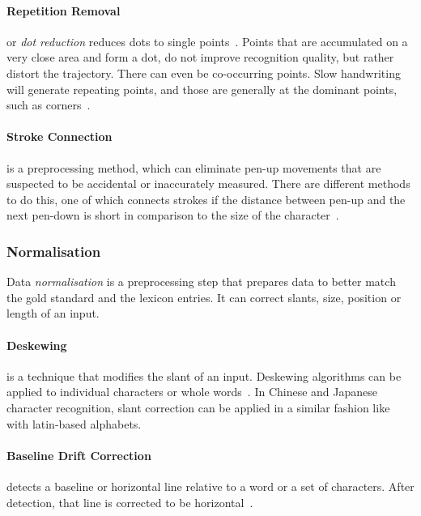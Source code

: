\paragraph{Repetition Removal}
\label{sec:repetitionremoval}
or \emph{dot reduction} reduces dots to single 
points~. Points that are accumulated on a very close 
area and form a dot, do not improve recognition quality, but rather distort the 
trajectory. There can even be co-occurring points. Slow handwriting will generate
repeating points, and those are generally at the dominant points, such as
corners~.

\paragraph{Stroke Connection}
\label{sec:strokeconnection}
is a preprocessing method, which can eliminate pen-up movements
that are suspected to be accidental or inaccurately measured. There are different
methods to do this, one of which connects strokes if the distance between pen-up
and the next pen-down is short in comparison to the size of the 
character~.

\subsubsection{Normalisation} 
\label{sec:normalisation}
Data \emph{normalisation} is a preprocessing step that prepares data to better
match the gold standard and the lexicon entries. It can correct slants, size, 
position or length of an input.

\paragraph{Deskewing}
is a technique that modifies the slant of an input. Deskewing 
algorithms can be applied to individual characters or 
whole words~. In Chinese and Japanese character recognition, 
slant correction can be applied in a similar fashion like with latin-based alphabets.

\paragraph{Baseline Drift Correction} 
detects a baseline or horizontal line relative
to a word or a set of characters. After detection, that line is corrected to
be horizontal~.

